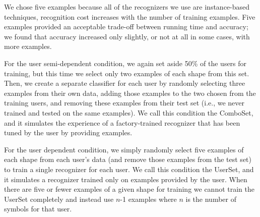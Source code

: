 \documentclass[final,5p,twocolumn]{elsarticle}
\begin{document}
We chose five examples because all of the recognizers we use
are instance-based techniques, recognition cost increases with the
number of training examples.   Five examples provided an acceptable
trade-off between running time and accuracy; we found that accuracy increased
only slightly, or not at all in some cases, with more examples. 

For the user semi-dependent condition, we again set aside 50\% of the
users for training, but this time we select only two examples of each
shape from this set.  Then, we create a separate classifier for each
user by randomly selecting three examples from their own data, adding
those examples to the two chosen from the training users, and removing
these examples from their test set (i.e., we never trained and tested
on the same examples).  We call this condition the ComboSet, and
it simulates the experience of a factory-trained recognizer that has
been tuned by the user by providing examples.

For the user dependent condition, we simply randomly select five
examples of each shape from each user's data (and remove those
examples from the test set) to train a single recognizer for each
user.  We call this condition the UserSet, and it simulates a
recognizer trained only on examples provided by the user. 
When there are five or fewer examples of a given shape for training 
we cannot train the UserSet completely and instead use $n$-1 examples 
where $n$ is the number of symbols for that user.
\end{document}
